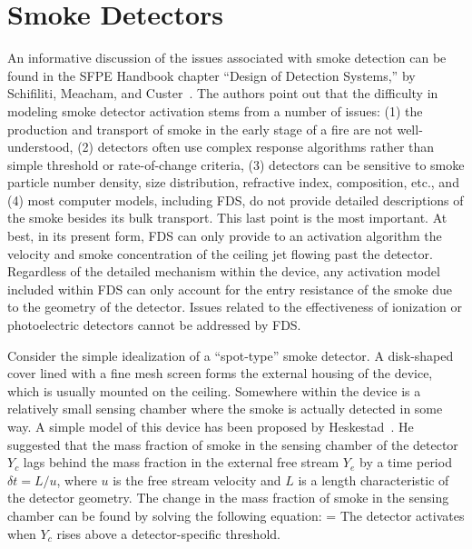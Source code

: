 \section{Smoke Detectors}

An informative discussion of the issues associated with smoke detection can be found in the
SFPE Handbook chapter ``Design of Detection Systems,'' by Schifiliti, Meacham, and Custer~\cite{SFPE}.
The authors point out that the difficulty in modeling smoke detector activation stems from a number of issues:
(1) the production and transport of smoke in the early stage of a fire are not well-understood, (2) detectors often use
complex response algorithms rather than simple threshold or rate-of-change criteria, (3) detectors can be sensitive
to smoke particle number density, size distribution, refractive index, composition, etc., and (4) most
computer models, including FDS, do not provide detailed descriptions of the smoke besides its bulk transport. This
last point is the most important. At best, in its present form, FDS can only provide to an activation algorithm the
velocity and smoke concentration of the ceiling jet flowing past the detector. Regardless of the
detailed mechanism within
the device, any activation model included within FDS can only account for the entry resistance of the smoke due to the
geometry of the detector. Issues related to the effectiveness of ionization or photoelectric detectors cannot be
addressed by FDS.

Consider the simple idealization of a ``spot-type'' smoke detector. A disk-shaped cover lined with a fine mesh screen
forms the external housing of the device, which is usually mounted on the ceiling.
Somewhere within the device is a relatively small sensing chamber where the smoke is actually detected in some way.
A simple model of this device has been proposed by Heskestad~\cite{SFPE}. He suggested that the mass fraction of smoke in the
sensing chamber of the detector $Y_c$ lags behind the mass fraction in the
external free stream $Y_e$ by a time period $\delta t = L/u$,
where $u$ is the free stream velocity and $L$ is a length characteristic of the detector geometry.
The change in the mass fraction of smoke in the sensing chamber can be found by solving the following equation:
\be {} =  \label{HYoeq} \ee
The detector activates when $Y_c$ rises above a detector-specific threshold.

